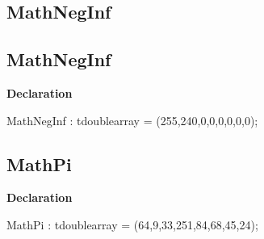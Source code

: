 \documentclass{report}
\newif\ifpdf
\begin{document}
\subsection*{\large{\textbf{MathNegInf}}\normalsize\hspace{1ex}\hrulefill}
\else
\subsection*{MathNegInf}
\fi
\label{ok_if_directive-MathNegInf}
\begin{list}{}{
\setlength{\itemindent}{0cm}
\setlength{\listparindent}{0cm}
\setlength{\leftmargin}{\evensidemargin}
\addtolength{\leftmargin}{\tmplength}
\settowidth{\labelsep}{X}
\addtolength{\leftmargin}{\labelsep}
\setlength{\labelwidth}{\tmplength}
}
\item[\textbf{Declaration}\hfill]
\ifpdf
\begin{flushleft}
\fi
\begin{ttfamily}
MathNegInf : tdoublearray = (255,240,0,0,0,0,0,0);\end{ttfamily}

\ifpdf
\end{flushleft}
\fi

\end{list}
\ifpdf
\subsection*{\large{\textbf{MathPi}}\normalsize\hspace{1ex}\hrulefill}
\else
\subsection*{MathPi}
\fi
\label{ok_if_directive-MathPi}
\begin{list}{}{
\setlength{\itemindent}{0cm}
\setlength{\listparindent}{0cm}
\setlength{\leftmargin}{\evensidemargin}
\addtolength{\leftmargin}{\tmplength}
\settowidth{\labelsep}{X}
\addtolength{\leftmargin}{\labelsep}
\setlength{\labelwidth}{\tmplength}
}
\item[\textbf{Declaration}\hfill]
\ifpdf
\begin{flushleft}
\fi
\begin{ttfamily}
MathPi : tdoublearray =  (64,9,33,251,84,68,45,24);\end{ttfamily}

\ifpdf
\end{flushleft}
\fi

\end{list}
\ifpdf
\end{document}
